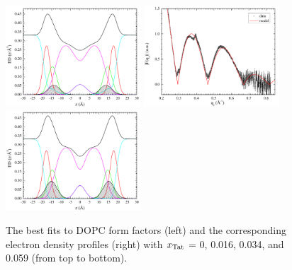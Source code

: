 \begin{figure}[htbp]
  \includegraphics[width=0.45\textwidth,valign=t]{figures/Tat/SDP_Results/EDP/DOPC_Tat_28to1_3p0_EDP1}
  \includegraphics[width=0.45\textwidth,valign=t]{figures/Tat/SDP_Results/XFF/DOPC_Tat_16to1_3p0_XFF1}
  \includegraphics[width=0.45\textwidth,valign=t]{figures/Tat/SDP_Results/EDP/DOPC_Tat_16to1_3p0_EDP1}
  \caption{The best fits to DOPC form factors (left) and the corresponding 
  electron density profiles (right) with $x_\textrm{Tat}$ = 0, 0.016, 0.034, 
  and 0.059 (from top to bottom).}
  \label{fig:DOPC_Tat_XFF1}
\end{figure}


